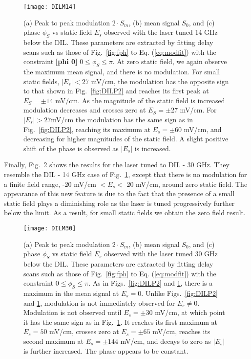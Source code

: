 \documentclass[aps,pra,reprint,groupedaddress]{revtex4-1}
\begin{document}
\begin{figure}
	\texttt{[image: DILM14]}
	\caption{(a) Peak to peak modulation $2 \cdot S_m$, (b) mean signal $S_0$, and (c) phase $\phi_S$ vs static field $E_s$ observed with the laser tuned 14 GHz below the DIL. These parameters are extracted by fitting delay scans such as those of Fig.~\ref{fig:fph} to Eq. (\ref{eq:modfit}) with the constraint \textbf{[phi 0]} $0 \leq \phi_S \leq \pi$. At zero static field, we again observe the maximum mean signal, and there is no modulation. For small static fields, $|E_s|<27$ mV/cm, the modulation has the opposite sign to that shown in Fig.~\ref{fig:DILP2} and reaches its first peak at $E_S = \pm 14$ mV/cm. As the magnitude of the static field is increased modulation decreases and crosses zero at $E_S = \pm 27$ mV/cm. For $|E_s|> 27$mV/cm the modulation has the same sign as in Fig.~\ref{fig:DILP2}, reaching its maximum at $E_s= \pm 60$ mV/cm, and decreasing for higher magnitudes of the static field. A slight positive shift of the phase is observed as $|E_s|$ is increased.}
	\label{fig:DILM14}
\end{figure}

Finally, Fig.~\ref{fig:DILM30} shows the results for the laser tuned to DIL - 30 GHz. They resemble the DIL - 14 GHz case of Fig.~\ref{fig:DILM14}, except that there is no modulation for a finite field range, -20 mV/cm $<E_s<$ 20 mV/cm, around zero static field. The appearance of this new feature is due to the fact that the presence of a small static field plays a diminishing role as the laser is tuned progressively further below the limit. As a result, for small static fields we obtain the zero field result.

\begin{figure}
	\texttt{[image: DILM30]}
	\caption{(a) Peak to peak modulation $2 \cdot S_m$, (b) mean signal $S_0$, and (c) phase $\phi_S$ vs static field $E_s$ observed with the laser tuned 30 GHz below the DIL. These parameters are extracted by fitting delay scans such as those of Fig.~\ref{fig:fph} to Eq. (\ref{eq:modfit}) with the constraint $0 \leq \phi_S \leq \pi$. As in Figs.~\ref{fig:DILP2} and \ref{fig:DILM14}, there is a maximum in the mean signal at $E_s=0$. Unlike Figs.~\ref{fig:DILP2} and \ref{fig:DILM14}, modulation is not immediately observed for $E_s\neq 0$. Modulation is not observed until $E_s=\pm 30$ mV/cm, at which point it has the same sign as in Fig.~\ref{fig:DILM14}. It reaches its first maximum at $E_s = 50$ mV/cm, crosses zero at $E_s=\pm 65$ mV/cm, reaches its second maximum at $E_s = \pm 144$ mV/cm, and decays to zero as $|E_s|$ is further increased. The phase appears to be constant.}
	\label{fig:DILM30}
\end{figure}
\end{document}

